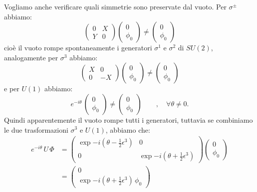Vogliamo anche verificare quali simmetrie sono preservate dal vuoto. Per $\sigma^\pm$ abbiamo:
\begin{equation}
    \begin{pmatrix}
        0 & X \\
        Y & 0
    \end{pmatrix}\begin{pmatrix}
        0 \\
        \phi_0
    \end{pmatrix} \neq \begin{pmatrix}
        0 \\
        \phi_0
    \end{pmatrix}
\end{equation}
cioè il vuoto rompe spontaneamente i generatori $\sigma^1$ e $\sigma^2$ di $SU(2)$, analogamente per $\sigma^3$ abbiamo:
\begin{equation}
    \begin{pmatrix}
        X & 0 \\
        0 & -X
    \end{pmatrix}\begin{pmatrix}
        0 \\
        \phi_0
    \end{pmatrix} \neq \begin{pmatrix}
        0 \\
        \phi_0
    \end{pmatrix}
\end{equation}
e per $U(1)$ abbiamo:
\begin{equation}
    e^{-i\theta}\, \begin{pmatrix}
        0 \\
        \phi_0
    \end{pmatrix} \neq \begin{pmatrix}
        0 \\
        \phi_0
    \end{pmatrix} \qquad , \quad \forall\theta\neq 0.
\end{equation}
Quindi apparentemente il vuoto rompe tutti i generatori, tuttavia se combiniamo le due trasformazioni $\sigma^3$ e $U(1)$, abbiamo che:
\begin{align}
    e^{-i\theta}\, U\, \Phi &= \begin{pmatrix}
        \exp{-i\left(\theta - \frac{1}{2}\epsilon^3\right)} & 0 \\
        0 & \exp{-i\left(\theta + \frac{1}{2}\epsilon^3\right)}
    \end{pmatrix}\begin{pmatrix}
        0 \\
        \phi_0
    \end{pmatrix} \\
    &= \begin{pmatrix}
        0 \\
        \exp{-i\left(\theta + \frac{1}{2}\epsilon^3\right)}\, \phi_0
    \end{pmatrix}
\end{align}
